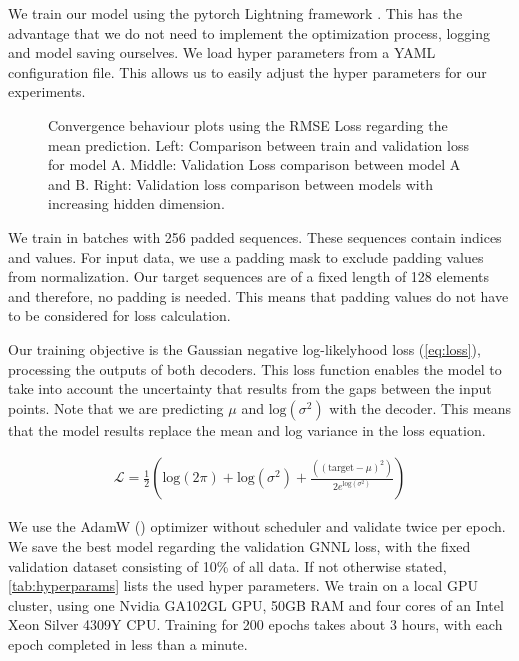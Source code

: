 We train our model using the pytorch Lightning framework \cite{falcon2019pytorch}. This has the advantage that we do not need to implement the optimization process, logging and model saving ourselves. We load hyper parameters from a YAML configuration file. This allows us to easily adjust the hyper parameters for our experiments.

\begin{figure*}
	\centering
	\resizebox{0.9\textwidth}{!}{
		
		
		
	}
	\caption{Convergence behaviour plots using the RMSE Loss regarding the mean prediction. Left: Comparison between train and validation loss for model A. Middle: Validation Loss comparison between model A and B. Right: Validation loss comparison between models with increasing hidden dimension.}
	\label{fig:loss_plot}
\end{figure*}

We train in batches with 256 padded sequences. These sequences contain indices and values. For input data, we use a padding mask to exclude padding values from normalization. Our target sequences are of a fixed length of 128 elements and therefore, no padding is needed. This means that padding values do not have to be considered for loss calculation.

Our training objective is the Gaussian negative log-likelyhood loss (\autoref{eq:loss}), processing the outputs of both decoders. This loss function enables the model to take into account the uncertainty that results from the gaps between the input points. Note that we are predicting $\mu$ and $\text{log} (\sigma^2)$ with the decoder. This means that the model results replace the mean and log variance in the loss equation.

\begin{align}
\mathcal{L} = \frac{1}{2}\left(\text{log}(2\pi) + \text{log}(\sigma^2) + \frac{((\text{target} - \mu)^2)}{2 e^{\text{log}(\sigma^2)}}\right) \label{eq:loss}
\end{align}

We use the AdamW (\citet{loshchilov2017fixing}) optimizer without scheduler and validate twice per epoch. We save the best model regarding the validation GNNL loss, with the fixed validation dataset consisting of 10\% of all data. If not otherwise stated, \autoref{tab:hyperparams} lists the used hyper parameters. We train on a local GPU cluster, using one Nvidia GA102GL GPU, 50GB RAM and four cores of an Intel Xeon Silver 4309Y CPU. Training for 200 epochs takes about 3 hours, with each epoch completed in less than a minute.

